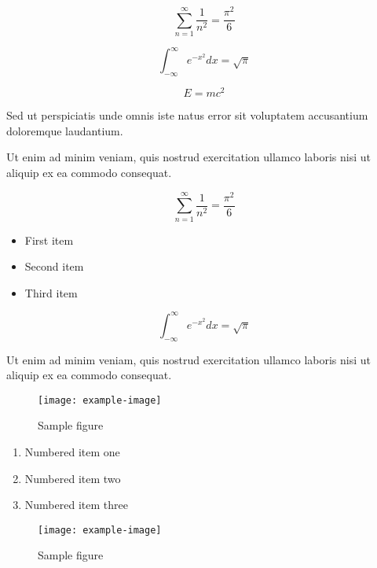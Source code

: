 \documentclass{article}
\begin{document}
\begin{equation}
    \sum_{n=1}^{\infty} \frac{1}{n^2} = \frac{\pi^2}{6}
\end{equation}


\begin{equation}
    \int_{-\infty}^{\infty} e^{-x^2} dx = \sqrt{\pi}
\end{equation}

\begin{equation}
    E = mc^2
\end{equation}

Sed ut perspiciatis unde omnis iste natus error sit voluptatem accusantium doloremque laudantium.

Ut enim ad minim veniam, quis nostrud exercitation ullamco laboris nisi ut aliquip ex ea commodo consequat.

\begin{equation}
    \sum_{n=1}^{\infty} \frac{1}{n^2} = \frac{\pi^2}{6}
\end{equation}

\begin{itemize}
\item First item
\item Second item
\item Third item
\end{itemize}


\begin{equation}
    \int_{-\infty}^{\infty} e^{-x^2} dx = \sqrt{\pi}
\end{equation}

Ut enim ad minim veniam, quis nostrud exercitation ullamco laboris nisi ut aliquip ex ea commodo consequat.

\begin{figure}[h]
    \centering
    \texttt{[image: example-image]}
    \caption{Sample figure}
    \label{fig:sample}
\end{figure}

\begin{enumerate}
\item Numbered item one
\item Numbered item two
\item Numbered item three
\end{enumerate}


\begin{figure}[h]
    \centering
    \texttt{[image: example-image]}
    \caption{Sample figure}
    \label{fig:sample}
\end{figure}
\end{document}
